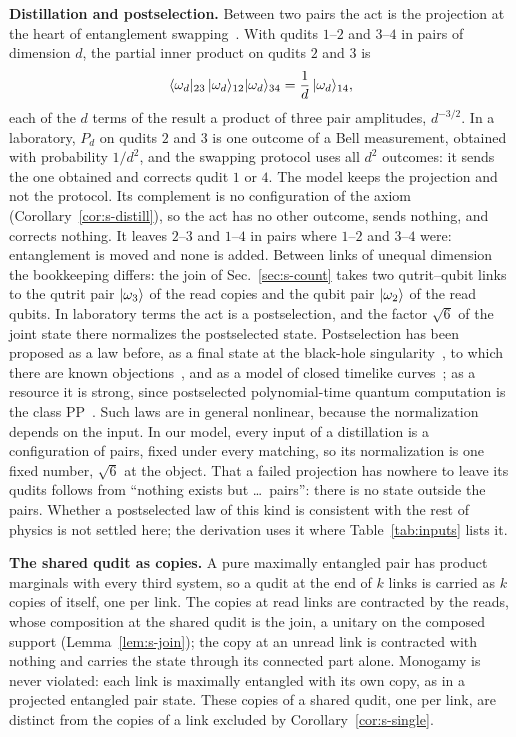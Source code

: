 \textbf{Distillation and postselection.} Between two pairs the act is the projection at the heart of entanglement swapping~\cite{zukowski1993}. With qudits $1$--$2$ and $3$--$4$ in pairs of dimension $d$, the partial inner product on qudits $2$ and $3$ is
\begin{equation}
\langle\omega_{d}|_{23}\,|\omega_{d}\rangle_{12}|\omega_{d}\rangle_{34}=\frac{1}{d}\,|\omega_{d}\rangle_{14},
\label{eq:s-swap}
\end{equation}
each of the $d$ terms of the result a product of three pair amplitudes, $d^{-3/2}$. In a laboratory, $P_{d}$ on qudits $2$ and $3$ is one outcome of a Bell measurement, obtained with probability $1/d^{2}$, and the swapping protocol uses all $d^{2}$ outcomes: it sends the one obtained and corrects qudit $1$ or $4$. The model keeps the projection and not the protocol. Its complement is no configuration of the axiom (Corollary~\ref{cor:s-distill}), so the act has no other outcome, sends nothing, and corrects nothing. It leaves $2$--$3$ and $1$--$4$ in pairs where $1$--$2$ and $3$--$4$ were: entanglement is moved and none is added. Between links of unequal dimension the bookkeeping differs: the join of Sec.~\ref{sec:s-count} takes two qutrit--qubit links to the qutrit pair $|\omega_{3}\rangle$ of the read copies and the qubit pair $|\omega_{2}\rangle$ of the read qubits. In laboratory terms the act is a postselection, and the factor $\sqrt{6}$ of the joint state there normalizes the postselected state. Postselection has been proposed as a law before, as a final state at the black-hole singularity~\cite{horowitz2004}, to which there are known objections~\cite{gottesman2004}, and as a model of closed timelike curves~\cite{lloyd2011}; as a resource it is strong, since postselected polynomial-time quantum computation is the class PP~\cite{aaronson2005}. Such laws are in general nonlinear, because the normalization depends on the input. In our model, every input of a distillation is a configuration of pairs, fixed under every matching, so its normalization is one fixed number, $\sqrt{6}$ at the object. That a failed projection has nowhere to leave its qudits follows from ``nothing exists but \ldots\ pairs'': there is no state outside the pairs. Whether a postselected law of this kind is consistent with the rest of physics is not settled here; the derivation uses it where Table~\ref{tab:inputs} lists it.

\textbf{The shared qudit as copies.} A pure maximally entangled pair has product marginals with every third system, so a qudit at the end of $k$ links is carried as $k$ copies of itself, one per link. The copies at read links are contracted by the reads, whose composition at the shared qudit is the join, a unitary on the composed support (Lemma~\ref{lem:s-join}); the copy at an unread link is contracted with nothing and carries the state through its connected part alone. Monogamy is never violated: each link is maximally entangled with its own copy, as in a projected entangled pair state. These copies of a shared qudit, one per link, are distinct from the copies of a link excluded by Corollary~\ref{cor:s-single}.

